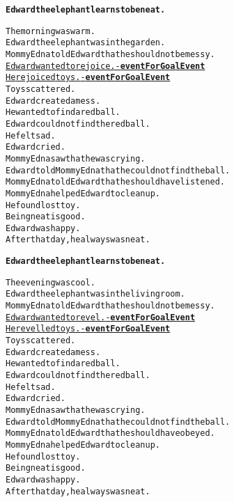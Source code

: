 \begin{alltt}
\textbf{Edward the elephant learns to be neat.}

The morning was warm.
Edward the elephant was in the garden.
Mommy Edna told Edward that he should not be messy.
\underline{Edward wanted to rejoice. - \textbf{eventForGoalEvent}}
\underline{He rejoiced toys. - \textbf{eventForGoalEvent}}
Toys scattered.
Edward created a mess.
He wanted to find a red ball.
Edward could not find the red ball.
He felt sad.
Edward cried.
Mommy Edna saw that he was crying.
Edward told Mommy Edna that he could not find the ball.
Mommy Edna told Edward that he should have listened.
Mommy Edna helped Edward to clean up.
He found lost toy.
Being neat is good.
Edward was happy.
After that day, he always was neat.

\textbf{Edward the elephant learns to be neat.}

The evening was cool.
Edward the elephant was in the living room.
Mommy Edna told Edward that he should not be messy.
\underline{Edward wanted to revel. - \textbf{eventForGoalEvent}}
\underline{He revelled toys. - \textbf{eventForGoalEvent}}
Toys scattered.
Edward created a mess.
He wanted to find a red ball.
Edward could not find the red ball.
He felt sad.
Edward cried.
Mommy Edna saw that he was crying.
Edward told Mommy Edna that he could not find the ball.
Mommy Edna told Edward that he should have obeyed.
Mommy Edna helped Edward to clean up.
He found lost toy.
Being neat is good.
Edward was happy.
After that day, he always was neat.
\end{alltt}

